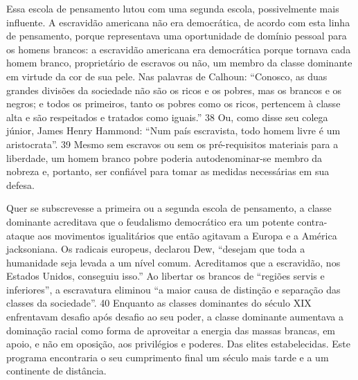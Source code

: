  
\par
 
Essa escola de pensamento lutou com uma segunda escola, possivelmente mais influente. A escravidão americana não era democrática, de acordo com esta linha de pensamento, porque representava uma oportunidade de domínio pessoal para os homens brancos: a escravidão americana era democrática porque tornava cada homem branco, proprietário de escravos ou não, um membro da classe dominante em virtude da cor de sua pele. Nas palavras de Calhoun: “Conosco, as duas grandes divisões da sociedade não são os ricos e os pobres, mas os brancos e os negros; e todos os primeiros, tanto os pobres como os ricos, pertencem à classe alta e são respeitados e tratados como iguais.”
 {\color{blue} 38}  
Ou, como disse seu colega júnior, James Henry Hammond: “Num país escravista, todo homem livre é um aristocrata”.
 {\color{blue} 39}  
Mesmo sem escravos ou sem os pré-requisitos materiais para a liberdade, um homem branco pobre poderia autodenominar-se membro da nobreza e, portanto, ser confiável para tomar as medidas necessárias em sua defesa.
 
\par
 
Quer se subscrevesse a primeira ou a segunda escola de pensamento, a classe dominante acreditava que o feudalismo democrático era um potente contra-ataque aos movimentos igualitários que então agitavam a Europa e a América jacksoniana. Os radicais europeus, declarou Dew, “desejam que toda a humanidade seja levada a um nível comum. Acreditamos que a escravidão, nos Estados Unidos, conseguiu isso.” Ao libertar os brancos de “regiões servis e inferiores”, a escravatura eliminou “a maior causa de distinção e separação das classes da sociedade”.
 {\color{blue} 40}  
Enquanto as classes dominantes do século XIX enfrentavam desafio após desafio ao seu poder, a classe dominante aumentava a dominação racial como forma de aproveitar a energia das massas brancas, em apoio, e não em oposição, aos privilégios e poderes. Das elites estabelecidas. Este programa encontraria o seu cumprimento final um século mais tarde e a um continente de distância.
 
\par
 
